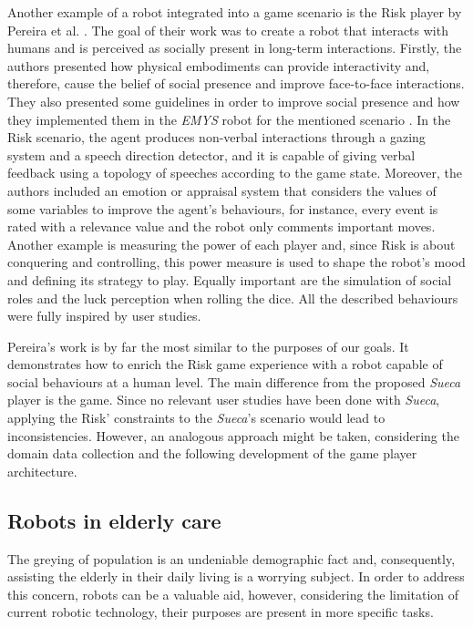 Another example of a robot integrated into a game scenario is the Risk player by Pereira et al. \cite{Lisboa}.
The goal of their work was to create a robot that interacts with humans and is perceived as socially present in long-term interactions.
Firstly, the authors presented how physical embodiments can provide interactivity and, therefore, cause the belief of social presence and improve face-to-face interactions.
They also presented some guidelines in order to improve social presence and how they implemented them in the \emph{EMYS} robot for the mentioned scenario \cite{Pereira}.
In the Risk scenario, the agent produces non-verbal interactions through a gazing system and a speech direction detector, and it is capable of giving verbal feedback using a topology of speeches according to the game state.
Moreover, the authors included an emotion or appraisal system that considers the values of some variables to improve the agent's behaviours, for instance, every event is rated with a relevance value and the robot only comments important moves.
Another example is measuring the power of each player and, since Risk is about conquering and controlling, this power measure is used to shape the robot's mood and defining its strategy to play.
Equally important are the simulation of social roles and the luck perception when rolling the dice.
All the described behaviours were fully inspired by user studies.

Pereira's work is by far the most similar to the purposes of our goals.
It demonstrates how to enrich the Risk game experience with a robot capable of social behaviours at a human level.
The main difference from the proposed \emph{Sueca} player is the game.
Since no relevant user studies have been done with \emph{Sueca}, applying the Risk' constraints to the \emph{Sueca}'s scenario would lead to inconsistencies.
However, an analogous approach might be taken, considering the domain data collection and the following development of the game player architecture.

\subsection{Robots in elderly care}

The greying of population is an undeniable demographic fact and, consequently, assisting the elderly in their daily living is a worrying subject.
In order to address this concern, robots can be a valuable aid, however, considering the limitation of current robotic technology, their purposes are present in more specific tasks.


